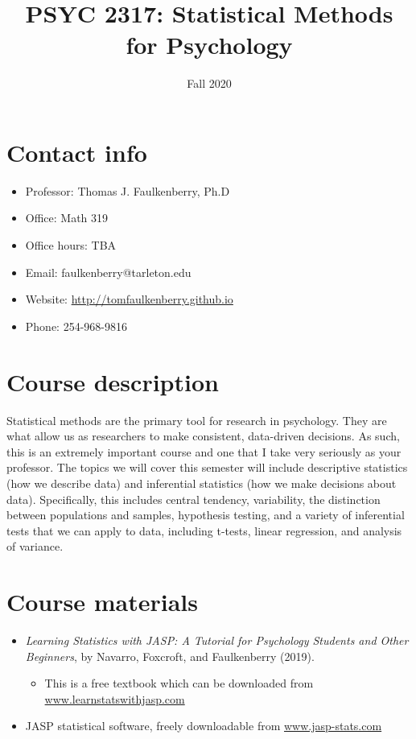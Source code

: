 \documentclass[10pt]{article}
\date{Fall 2020}
\title{PSYC 2317: Statistical Methods for Psychology}
\begin{document}
\maketitle

\section*{Contact info}
\label{sec:org7ca9fd9}
\begin{itemize}
\item Professor: Thomas J. Faulkenberry, Ph.D
\item Office: Math 319
\item Office hours: TBA
\item Email: faulkenberry@tarleton.edu
\item Website: \url{http://tomfaulkenberry.github.io}
\item Phone: 254-968-9816
\end{itemize}

\section*{Course description}
\label{sec:org72000f5}

Statistical methods are the primary tool for research in psychology. They are what allow us as researchers to make consistent, data-driven decisions.  As such, this is an extremely important course and one that I take very seriously as your professor. The topics we will cover this semester will include descriptive statistics (how we describe data) and inferential statistics (how we make decisions about data).  Specifically, this includes central tendency, variability, the distinction between populations and samples, hypothesis testing, and a variety of inferential tests that we can apply to data, including t-tests, linear regression, and analysis of variance.

\section*{Course materials}
\label{sec:orga6143af}
\begin{itemize}
\item \emph{Learning Statistics with JASP: A Tutorial for Psychology Students and Other Beginners}, by Navarro, Foxcroft, and Faulkenberry (2019). 
\begin{itemize}
\item This is a free textbook which can be downloaded from \href{http://learnstatswithjasp.com}{www.learnstatswithjasp.com}
\end{itemize}
\item JASP statistical software, freely downloadable from \href{http://www.jasp-stats.com}{www.jasp-stats.com}
\end{itemize}
\end{document}
